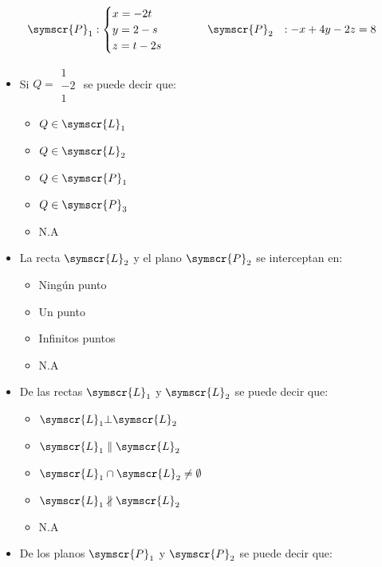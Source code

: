 \documentclass{article}
\def\fancyL{\symscr{L}}
\def\fancyP{\symscr{P}}
\begin{document}
\begin{enumerate}
\[\begin{aligned}
            \fancyP_1 &:
            \begin{cases}
                x = -2t \\
                y = 2 - s \\
                z = t - 2s
            \end{cases}
            \hspace{1cm}
            \fancyP_2 &: -x + 4y - 2z = 8
        \end{aligned}
    \]
    \begin{itemize}
        \item Si \(Q = \begin{smallmatrix}1 \\ −2 \\ 1\end{smallmatrix}\) se puede decir que:
            \begin{itemize}
                \item \(Q \in \fancyL_1\)
                \item \(Q \in \fancyL_2\)
                \item \(Q \in \fancyP_1\)
                \item \(Q \in \fancyP_3\)
                \item N.A
            \end{itemize}
        \item La recta \(\fancyL_2\) y el plano \(\fancyP_2\) se interceptan en:
            \begin{itemize}
				\item Ningún punto
				\item Un punto
				\item Infinitos puntos
				\item N.A
            \end{itemize}
        \item De las rectas \(\fancyL_1\) y \(\fancyL_2\) se puede decir que:
            \begin{itemize}
                \item \(\fancyL_1 \bot \fancyL_2\)
                \item \(\fancyL_1 \parallel \fancyL_2\)
                \item \(\fancyL_1 \cap \fancyL_2 \neq \emptyset\)
                \item \(\fancyL_1 \nparallel \fancyL_2\)
                \item N.A
            \end{itemize}
        \item De los planos \(\fancyP_1\) y \(\fancyP_2\) se puede decir que:

\end{itemize}
\end{enumerate}
\end{document}
